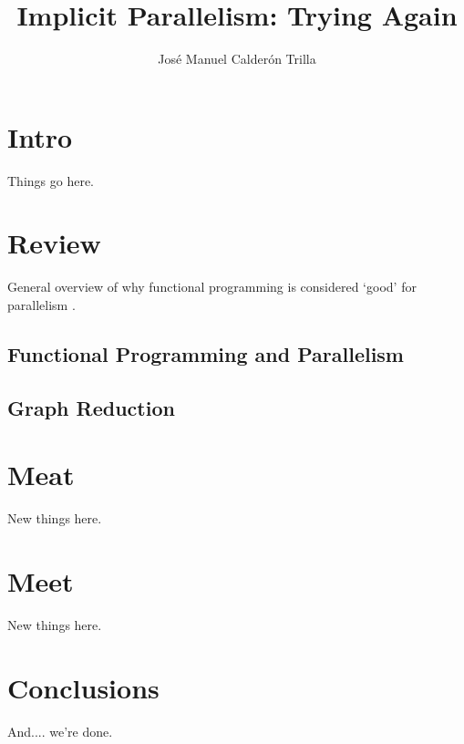 \documentclass{tufte-book}
\title{Implicit Parallelism: Trying Again}
\author{Jos\'{e} Manuel Calder\'{o}n Trilla}
\newcommand{\blankpage}{\newpage\hbox{}\thispagestyle{empty}\newpage}
\begin{document}
\frontmatter

\blankpage

\maketitle

\tableofcontents
\listoffigures
\listoftables

\chapter{Intro}

    Things go here.

\chapter{Review}


    General overview of why functional programming is considered `good' for
    parallelism \citep{hughes:thesis}.
    \section{Functional Programming and Parallelism}
    
    
    \section{Graph Reduction}
    

\chapter{Meat}

    New things here.
    
\chapter{Meet}

    New things here.

\chapter{Conclusions}

    And.... we're done.

\backmatter



\end{document}
